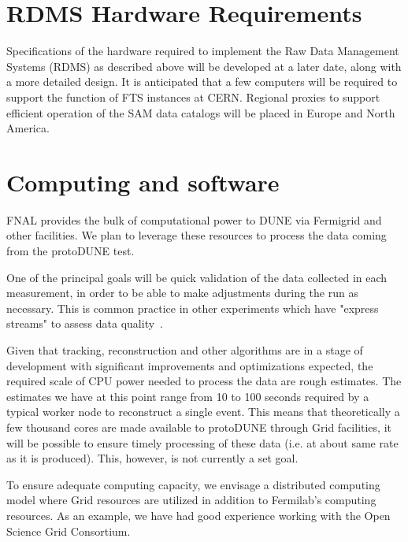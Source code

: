 \documentclass[12pt]{article}
\begin{document}
\section{RDMS Hardware Requirements}
Specifications of the hardware required to implement the Raw Data Management Systems (RDMS) as described above will be developed at a later date,
along with a more detailed design. It is anticipated that a few computers will be required to support the function of FTS instances at CERN.
Regional proxies to support efficient operation of the SAM data catalogs will be placed in Europe and North America.

\section{Computing and software}


FNAL provides the bulk of computational power to DUNE via Fermigrid and other facilities. 
We plan to leverage these resources to process the data coming from the protoDUNE test.

One of the principal goals will be quick validation of the data collected in each measurement, in
order to be able to make adjustments during the run as necessary. 
This is common practice in other experiments which have "express streams" to assess data quality~\cite{atlas_express}.


Given that tracking, reconstruction and other algorithms are in a stage of development with significant improvements
and optimizations expected, the required scale of CPU power needed to process the data are rough estimates.
The estimates we have at this point range from 10 to 100 seconds required by a typical worker node to reconstruct
a single event.  This means that theoretically a few thousand cores are made available to protoDUNE through Grid facilities,
it will be possible to ensure timely processing of these data (i.e. at about same rate as it is produced). This, however, is not
currently a set goal.

To ensure adequate computing capacity, we envisage a distributed computing model where Grid resources are
utilized in addition to Fermilab's computing resources. As an example, we have had good experience working
with the Open Science Grid Consortium.
\end{document}
